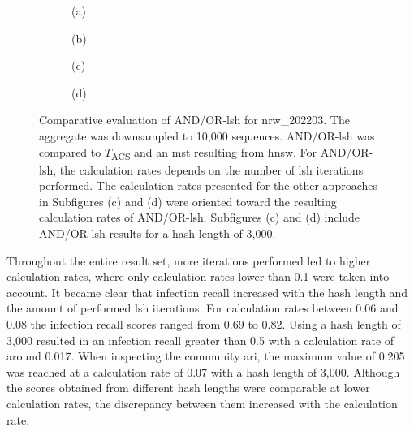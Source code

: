 \begin{figure}[H]
  \centering
  \begin{subfigure}[b]{0.47\textwidth}
    
    \caption*{(a)}
  \end{subfigure}
  \begin{subfigure}[b]{0.47\textwidth}
    
    \caption*{(b)}
  \end{subfigure}
   \begin{subfigure}[b]{0.47\textwidth}
    
    \caption*{(c)}
  \end{subfigure}
  \hfill
  \begin{subfigure}[b]{0.47\textwidth}
    
    \caption*{(d)}
  \end{subfigure}
  \caption[Comparative evaluation of AND/OR-\acrshort{lsh} for nrw\_202203]{Comparative evaluation of AND/OR-\acrshort{lsh} for nrw\_202203. The aggregate was downsampled to 10,000 sequences. AND/OR-\acrshort{lsh} was compared to $T$\textsubscript{ACS} and an \acrshort{mst} resulting from \acrshort{hnsw}. For AND/OR-\acrshort{lsh}, the calculation rates depends on the number of \acrshort{lsh} iterations performed. The calculation rates presented for the other approaches in Subfigures (c) and (d) were oriented toward the resulting calculation rates of AND/OR-\acrshort{lsh}. Subfigures (c) and (d) include AND/OR-\acrshort{lsh} results for a hash length of 3,000.}
  \label{fig:approximate_cs_nrw_202203}
\end{figure}

Throughout the entire result set, more iterations performed led to higher calculation rates, where only calculation rates lower than 0.1 were taken into account. It became clear that infection recall increased with the hash length and the amount of performed \acrshort{lsh} iterations. For calculation rates between 0.06 and 0.08 the infection recall scores ranged from 0.69 to 0.82. Using a hash length of 3,000 resulted in an infection recall greater than 0.5 with a calculation rate of around 0.017. When inspecting the community \acrshort{ari}, the maximum value of 0.205 was reached at a calculation rate of 0.07 with a hash length of 3,000. Although the scores obtained from different hash lengths were comparable at lower calculation rates, the discrepancy between them increased with the calculation rate.

